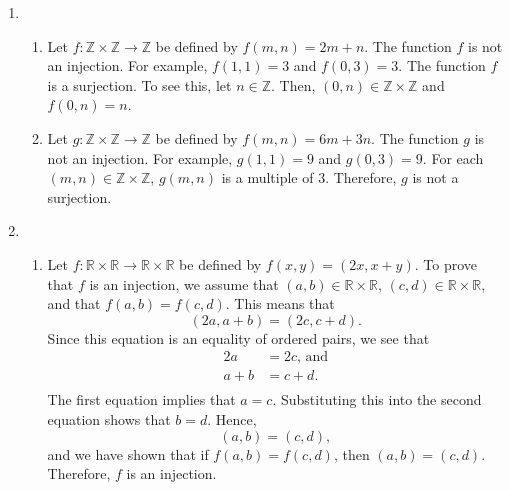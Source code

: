 \begin{enumerate}
\item \begin{enumerate}
\item Let $f:\mathbb{Z} \times \mathbb{Z} \to \mathbb{Z}$ be defined by  
$f( {m, n} ) = 2m + n$.  The function $f$ is not an injection.  For example, 
$f ( 1, 1 ) = 3$ and $f ( 0, 3 ) = 3$.  The function $f$ is a surjection.  To see this, let $n \in \mathbb{Z}$.  Then, 
$( 0, n ) \in \mathbb{Z} \times \mathbb{Z}$ and 
$f ( 0, n ) = n$.

\item Let $g:\mathbb{Z} \times \mathbb{Z} \to \mathbb{Z}$ be defined by  
$f( {m, n} ) = 6m + 3n$.  The function $g$ is not an injection.  For example, 
$g ( 1, 1 ) = 9$ and $g ( 0, 3 ) = 9$.  For each 
$( m, n ) \in \mathbb{Z} \times \mathbb{Z}$, $g ( m, n )$ is a multiple of 3.  Therefore, $g$ is not a surjection.
\end{enumerate}



\item \begin{enumerate}
\item Let 
$f:\mathbb{R} \times \mathbb{R} \to \mathbb{R} \times \mathbb{R}$ be defined by  
$f( {x, y} ) = ( {2x, x + y} )$. To prove that $f$  is an injection, we assume that  
$( {a, b} ) \in \mathbb{R} \times \mathbb{R}$, 
$( {c, d} ) \in \mathbb{R} \times \mathbb{R}$, and that  
$f( {a, b} ) = f( {c, d} )$.  This means that
\[
( {2a, a + b} ) = ( {2c, c + d} ).
\]
Since this equation is an equality of ordered pairs, we see that
\[
\begin{aligned}
       2a &= 2c \text{, and} \\ 
    a + b &= c + d. \\ 
\end{aligned}
\]
The first equation implies that $a = c$.  Substituting this into the second equation shows that 
$b = d$.  Hence, 
\[
( {a, b} ) = ( {c, d} ),
\]
and we have shown that if $f( {a, b} ) = f( {c, d} )$, then  
$( {a, b} ) = ( {c, d} )$.  Therefore,  $f$  is an injection.


\end{enumerate}
\end{enumerate}
